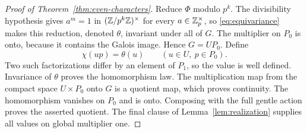 \begin{proof}[Proof of Theorem~\ref{thm:even-characters}]
Reduce $\Phi$ modulo $p^k$.  The divisibility hypothesis gives
$a^m=1$ in $(\mathbb Z/p^k\mathbb Z)^\times$ for every $a\in\mathbb Z_p^\times$,
so \eqref{eq:equivariance} makes this reduction, denoted $\theta$,
invariant under all of $G$.  The multiplier on $P_0$ is onto,
because it contains the Galois image.  Hence $G=UP_0$.
Define
\[
 \chi(up)=\theta(u)\qquad(u\in U,\ p\in P_0).
\]
Two such factorizations differ by an element of $P_1$, so the value
is well defined.  Invariance of $\theta$ proves the homomorphism law.
The multiplication map from the compact space $U\times P_0$ onto
$G$ is a quotient map, which proves continuity.  The homomorphism
vanishes on $P_0$ and is onto.  Composing with the full gentle action
proves the asserted quotient.  The final clause of
Lemma~\ref{lem:realization} supplies all values on global multiplier one.
\end{proof}

